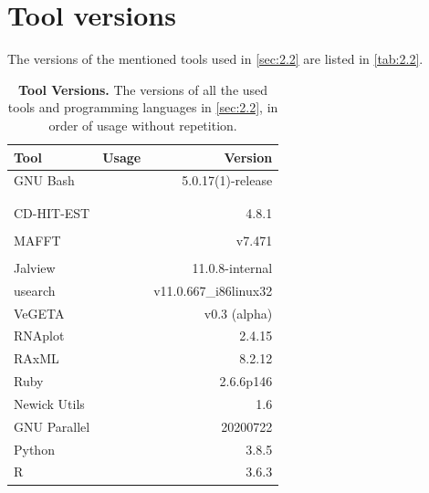 \clearpage
\section{Tool versions} \label{sec:2.4}

    The versions of the mentioned tools used in \autoref{sec:2.2} are listed in \autoref{tab:2.2}.

    \begin{table}[!htb]
        \centering
        \begin{tabu} to \textwidth{XX[3]R[2]}
    		\toprule
    		\textbf{Tool} & \textbf{Usage} & \ltab\textbf{Version}\\
    		\midrule
    	    GNU Bash &  & 5.0.17(1)-release\\
    	    &  & \\
    	    &  & \\
    		CD-HIT-EST &  & 4.8.1\\
    		&  & \\
    		MAFFT &  & v7.471\\
    		&  & \\
    		Jalview &  & 11.0.8-internal\\
    		usearch &  & v11.0.667\_i86linux32\\
    		VeGETA &  & v0.3 (alpha)\\
    		RNAplot &  & 2.4.15\\
    		RAxML &  & 8.2.12\\
    		Ruby &  & 2.6.6p146\\
    		Newick Utils &  & 1.6\\
    		GNU Parallel &  & 20200722\\
    		Python &  & 3.8.5\\
    		R &  & 3.6.3\\
    		\bottomrule
    	\end{tabu}
    	\caption[Tool versions]{\textbf{Tool Versions.} The versions of all the used tools and programming languages in \autoref{sec:2.2}, in order of usage without repetition.}
        \label{tab:2.2}
    \end{table}